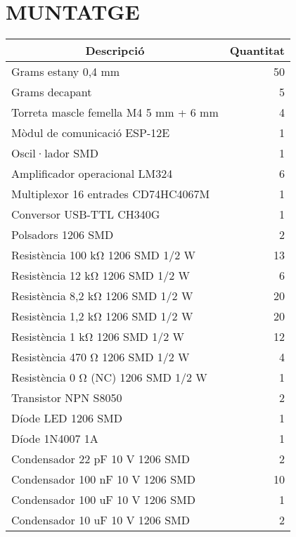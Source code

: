 \chapter{\uppercase{Muntatge}} %

\begin{table}[H]
  \begin{center}
    \begin{tabularx} {\textwidth} {|X|r|} \hline
  \multicolumn{1}{|c|}{Descripció} &  \multicolumn{1}{c|}{Quantitat}\\ \hline \hline
    Grams estany 0,4 mm & 50 \\ \hline
    Grams decapant & 5 \\ \hline
    Torreta mascle femella M4 5 mm + 6 mm & 4 \\ \hline
    Mòdul de comunicació ESP-12E & 1 \\ \hline
    Oscil·lador SMD & 1 \\ \hline
    Amplificador operacional LM324 & 6 \\ \hline
    Multiplexor 16 entrades CD74HC4067M & 1 \\ \hline
    Conversor USB-TTL CH340G & 1 \\ \hline
    Polsadors 1206 SMD & 2 \\ \hline
    Resistència 100 k\si{\ohm} 1206 SMD 1/2 W & 13 \\ \hline
    Resistència 12 k\si{\ohm} 1206 SMD 1/2 W & 6 \\ \hline
    Resistència 8,2 k\si{\ohm} 1206 SMD 1/2 W & 20 \\ \hline
    Resistència 1,2 k\si{\ohm} 1206 SMD 1/2 W & 20 \\ \hline
    Resistència 1 k\si{\ohm} 1206 SMD 1/2 W & 12 \\ \hline
    Resistència 470 \si{\ohm} 1206 SMD 1/2 W & 4 \\ \hline
    Resistència 0 \si{\ohm} (NC) 1206 SMD 1/2 W & 1 \\ \hline
    Transistor NPN S8050 & 2 \\ \hline
    Díode LED 1206 SMD & 1 \\ \hline
    Díode 1N4007 1A & 1 \\ \hline
    Condensador 22 pF 10 V 1206 SMD & 2 \\ \hline
    Condensador 100 nF 10 V 1206 SMD & 10 \\ \hline
    Condensador 100 uF 10 V 1206 SMD & 1 \\ \hline
    Condensador 10 uF 10 V 1206 SMD & 2 \\ \hline

\end{tabularx}
\end{center}
\end{table}
